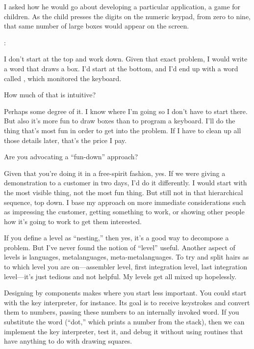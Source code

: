 \begin{interview}
I asked  how he would go about
developing a particular application, a game for children. As the child
presses the digits on the numeric keypad, from zero to nine, that same
number of large boxes would appear on the screen.

	:

\begin{tfquot}
	I don't start at the top and work down. Given that exact
	problem, I would write a word that draws a box. I'd start at
	the bottom, and I'd end up with a word called ,
	which monitored the keyboard.
\end{tfquot}


\noindent How much of that is intuitive?

\begin{tfquot}
	Perhaps some degree of it. I know where I'm going so I don't
	have to start there. But also it's more fun to draw boxes than
	to program a keyboard. I'll do the thing that's most fun in
	order to get into the problem. If I have to clean up all those
	details later, that's the price I pay.
\end{tfquot}

\noindent Are you advocating a ``fun-down'' approach?%

\begin{tfquot}
	Given that you're doing it in a free-spirit fashion, yes. If
	we were giving a demonstration to a customer in two days, I'd
	do it differently. I would start with the most visible thing,
	not the most fun thing. But still not in that hierarchical
	sequence, top down. I base my approach on more immediate
	considerations such as impressing the customer, getting
	something to work, or showing other people how it's going to
	work to get them interested.

	If you define a level as ``nesting,'' then yes, it's a good
	way to decompose a problem. But I've never found the notion of
	``level'' useful. Another aspect of levels is languages,
	metalanguages, meta-metalanguages. To try and split hairs as
	to which level you are on---assembler level, first integration
	level, last integration level---it's just tedious and not
	helpful. My levels get all mixed up hopelessly.
\end{tfquot}%
\end{interview}
Designing by components makes where you start less important. You
could start with the key interpreter, for instance. Its goal is to
receive keystrokes and convert them to numbers, passing these numbers
to an internally invoked word. If you substitute the \Forth{} word
 (``dot,'' which prints a number from the stack), then we can
implement the key interpreter, test it, and debug it without using
routines that have anything to do with drawing squares.

